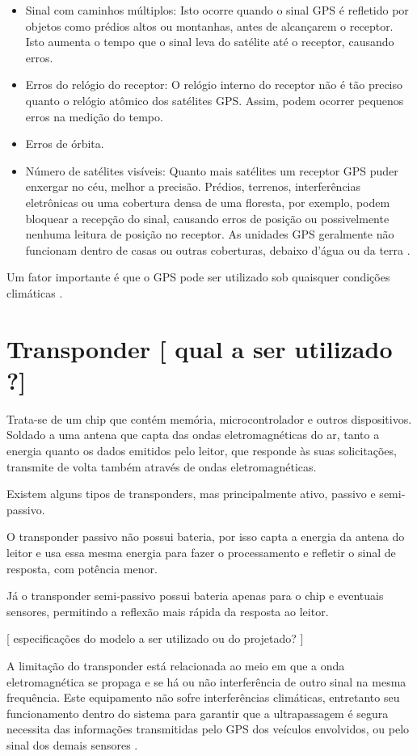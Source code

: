 \begin{itemize}
  \item Sinal com caminhos múltiplos: Isto ocorre quando o sinal GPS é refletido por objetos como prédios altos ou montanhas, antes de alcançarem o receptor. Isto aumenta o tempo que o sinal leva do satélite até o receptor, causando erros.
  \item Erros do relógio do receptor: O relógio interno do receptor não é tão preciso quanto o relógio atômico dos satélites GPS. Assim, podem ocorrer pequenos erros na medição do tempo.
  \item Erros de órbita.
  \item Número de satélites visíveis: Quanto mais satélites um receptor GPS puder enxergar no céu, melhor a precisão. Prédios, terrenos, interferências eletrônicas ou uma cobertura densa de uma floresta, por exemplo, podem bloquear a recepção do sinal, causando erros de posição ou possivelmente nenhuma leitura de posição no receptor. As unidades GPS geralmente não funcionam dentro de casas ou outras coberturas, debaixo d'água ou da terra \cite{gps}.
\end{itemize}

Um fator importante é que o GPS pode ser utilizado sob quaisquer condições climáticas \cite{gps2}.

\section{Transponder [ qual a ser utilizado ?]}

Trata-se de um chip que contém memória, microcontrolador e outros dispositivos. Soldado a uma antena que capta das ondas eletromagnéticas do ar, tanto a energia quanto os dados emitidos pelo leitor, que responde às suas solicitações, transmite de volta também através de ondas eletromagnéticas.

Existem alguns tipos de transponders, mas principalmente ativo, passivo e semi-passivo.

O transponder passivo não possui bateria, por isso capta a energia da antena do leitor e usa essa mesma energia para fazer o processamento e refletir o sinal de resposta, com potência menor.

Já o transponder semi-passivo possui bateria apenas para o chip e eventuais sensores, permitindo a reflexão mais rápida da resposta ao leitor.

[ especificações do modelo a ser utilizado ou do projetado? ]

A limitação do transponder está relacionada ao meio em que a onda eletromagnética se propaga e se há ou não interferência de outro sinal na mesma frequência. Este equipamento não sofre interferências climáticas, entretanto seu funcionamento dentro do sistema para garantir que a ultrapassagem é segura necessita das informações transmitidas pelo GPS dos veículos envolvidos, ou pelo sinal dos demais sensores \cite{transponder}.

